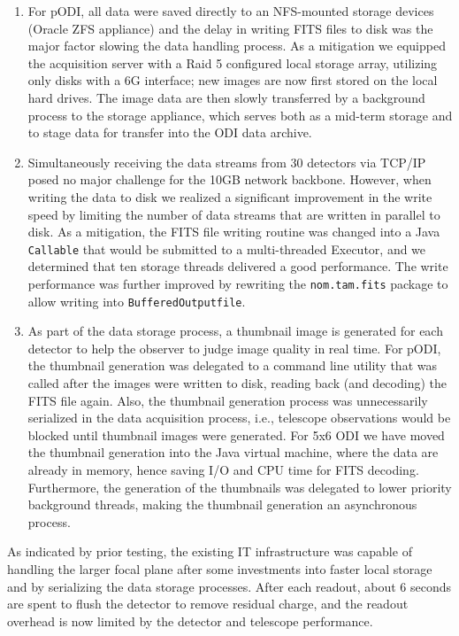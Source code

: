 \documentclass[]{spieman}
\begin{document}
\begin{enumerate} 
    
\item For pODI, all data were saved directly to an NFS-mounted storage devices (Oracle ZFS
appliance) and the delay in  writing FITS files to disk was the major factor
slowing the data handling process. As a mitigation we equipped the acquisition
server with a Raid 5 configured local storage array, utilizing only disks with a
6G interface; new images are now first stored on the local hard drives. The
image data are then slowly transferred by a background process to the storage
appliance, which serves both as a mid-term storage and to stage data for
transfer into the ODI data archive.

\item   Simultaneously receiving the data streams from 30 detectors via
TCP/IP posed no major challenge for the 10GB network backbone.  However, when
writing the data to disk we realized a significant  improvement in the write
speed by limiting the number of data streams that are written in parallel to
disk. As a mitigation, the FITS file writing routine was changed into a Java
{\tt Callable} that would be submitted to a multi-threaded Executor, and we
determined that ten storage threads delivered a good performance. The write
performance was further improved by rewriting the {\tt nom.tam.fits} package to
allow writing into {\tt BufferedOutputfile}.

\item As part of the data storage process, a thumbnail image is generated for
each detector to help the observer to judge image quality in real time. For
pODI, the thumbnail generation was delegated to a command line utility that was
called after the images were written to disk, reading back (and decoding) the
FITS file again. Also, the thumbnail generation process was unnecessarily
serialized in the data acquisition process, i.e., telescope observations would
be blocked until thumbnail images were generated.  For 5x6 ODI we have moved the
thumbnail generation into the Java virtual machine, where the data are already in
memory, hence saving I/O and CPU time for FITS decoding. Furthermore, the
generation of the thumbnails was delegated to  lower priority background
threads, making the thumbnail generation an asynchronous process.

    
\end{enumerate}

As indicated by prior testing, the existing IT infrastructure was capable of
handling the larger focal plane after some investments into faster local storage
and by serializing the data storage  processes.  After each readout, about 6
seconds are spent to flush the detector to remove residual charge, and the
readout overhead is now limited by the detector and telescope performance.
\end{document}
